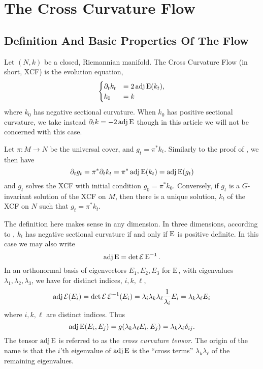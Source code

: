 \documentclass[a4paper, 12pt]{amsart}
\begin{document}
\section{The Cross Curvature Flow}
\label{sec:xcf}
\subsection{Definition And Basic Properties Of The Flow}
\label{subsec:xcf_defn}

Let \((N, k)\) be a closed, Riemannian manifold. The Cross Curvature Flow (in short, XCF) is the evolution equation,
\begin{equation}
\label{eq:xcf}
\begin{cases}
\partial_t k_t  &= 2 \operatorname{adj}\operatorname{E}(k_t), \\
k_0 &= k
\end{cases}
\end{equation}
where \(k_0\) has negative sectional curvature. When \(k_0\) has positive sectional curvature, we take instead \(\partial_t k = -2\operatorname{adj}\operatorname{E}\) though in this article we will not be concerned with this case.
\begin{rem}
Let \(\pi : M \to N\) be the universal cover, and \(g_t = \pi^{\ast} k_t\). Similarly to the proof of , we then have
\[
\partial_t g_t = \pi^{\ast} \partial_t k_t = \pi^{\ast} \operatorname{adj}\operatorname{E}(k_t) = \operatorname{adj}\operatorname{E}(g_t)
\]
and \(g_t\) solves the XCF with initial condition \(g_0 = \pi^{\ast} k_0\). Conversely, if \(g_t\) is a \(G\)-invariant solution of the XCF on \(M\), then there is a unique solution, \(k_t\) of the XCF on \(N\) such that \(g_t = \pi^{\ast} k_t\).
\end{rem}

The definition here makes sense in any dimension. In three dimensions, according to , \(k_t\) has negative sectional curvature if and only if \(\operatorname{E}\) is positive definite. In this case we may also write
\[
\operatorname{adj}\operatorname{E} = \det \operatorname{\mathcal{E}} \operatorname{E}^{-1}.
\]
In an orthonormal basis of eigenvectors \(E_1, E_2, E_3\) for \(\operatorname{E}\), with eigenvalues \(\lambda_1, \lambda_2, \lambda_3\), we have for distinct indices, \(i, k, \ell\),
\[
\operatorname{adj}\operatorname{\mathcal{E}} (E_i) = \det\operatorname{\mathcal{E}} \operatorname{\mathcal{E}}^{-1}(E_i) = \lambda_i \lambda_k \lambda_{\ell} \frac{1}{\lambda_i} E_i = \lambda_k \lambda_{\ell} E_i
\]
where \(i,k,\ell\) are distinct indices. Thus
\[
\operatorname{adj}\operatorname{E}(E_i, E_j) = g(\lambda_k \lambda_{\ell} E_i, E_j) = \lambda_k \lambda_{\ell} \delta_{ij}.
\]
The tensor \(\operatorname{adj}\operatorname{E}\) is referred to as the \emph{cross curvature tensor}. The origin of the name is that the \(i\)'th eigenvalue of \(\operatorname{adj}\operatorname{E}\) is the ``cross terms'' \(\lambda_k \lambda_{\ell}\) of the remaining eigenvalues.
\end{document}
